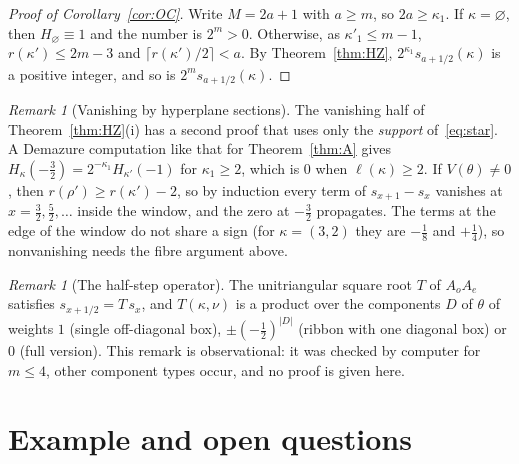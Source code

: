 \documentclass[submission]{FPSAC2027}
\theoremstyle{definition}
\theoremstyle{remark}
\newtheorem{remark}[theorem]{Remark}
\begin{document}
\begin{proof}[Proof of Corollary~\ref{cor:OC}]
Write $M=2a+1$ with $a\ge m$, so $2a\ge\kappa_1$. If $\kappa=\varnothing$, then
$H_\varnothing\equiv1$ and the number is $2^m>0$. Otherwise, as $\kappa'_1\le m-1$,
$r(\kappa')\le2m-3$ and $\lceil r(\kappa')/2\rceil<a$. By Theorem~\ref{thm:HZ},
$2^{\kappa_1}s_{a+1/2}(\kappa)$ is a positive integer, and so is $2^ms_{a+1/2}(\kappa)$.
\end{proof}

\begin{remark}[Vanishing by hyperplane sections]\label{rem:Z}
The vanishing half of Theorem~\ref{thm:HZ}(i) has a second proof that uses only the
\emph{support} of~\eqref{eq:star}. A Demazure computation like that for Theorem~\ref{thm:A} gives
$H_\kappa(-\tfrac32)=2^{-\kappa_1}H_{\kappa'}(-1)$ for $\kappa_1\ge2$, which is $0$ when
$\ell(\kappa)\ge2$. If $V(\theta)\ne0$, then $r(\rho')\ge r(\kappa')-2$, so by induction every term of
$s_{x+1}-s_x$ vanishes at $x=\tfrac32,\tfrac52,\dots$ inside the window, and the zero at
$-\tfrac32$ propagates. The terms at the edge of the window do not share a sign (for
$\kappa=(3,2)$ they are $-\tfrac18$ and $+\tfrac14$), so nonvanishing needs the fibre argument above.
\end{remark}

\begin{remark}[The half-step operator]\label{rem:T}
The unitriangular square root $T$ of $A_oA_e$ satisfies $s_{x+1/2}=T\,s_x$, and $T(\kappa,\nu)$ is
a product over the components $D$ of $\theta$ of weights $1$ (single off-diagonal box),
$\pm(-\tfrac12)^{|D|}$ (ribbon with one diagonal box) or $0$ (full version). This remark is
observational: it was checked by computer for $m\le4$, other component types occur, and no proof is
given here.
\end{remark}

\section{Example and open questions}\label{sec:examples}
\end{document}
